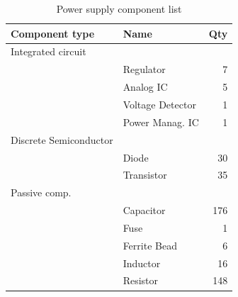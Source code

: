 \documentclass[11pt,a4paper,titlepage]{article}
\begin{document}
\begin{table}
\centering
\begin{tabular}{llr}
\toprule
\textbf{Component type} & \textbf{Name} & \textbf{Qty}\\
\midrule
Integrated circuit & & \\
 & Regulator & 7\\
 & Analog IC & 5\\
 & Voltage Detector & 1\\
 & Power Manag. IC & 1\\
\hline
Discrete Semiconductor & &\\
 & Diode & 30\\
 & Transistor & 35\\
\hline
Passive comp. & &\\
 & Capacitor & 176\\
 & Fuse & 1\\
 & Ferrite Bead & 6\\
 & Inductor & 16\\
 & Resistor & 148\\ 
\bottomrule
\end{tabular}
\caption{Power supply component list}
\label{tab:power}
\end{table}




\end{document}
